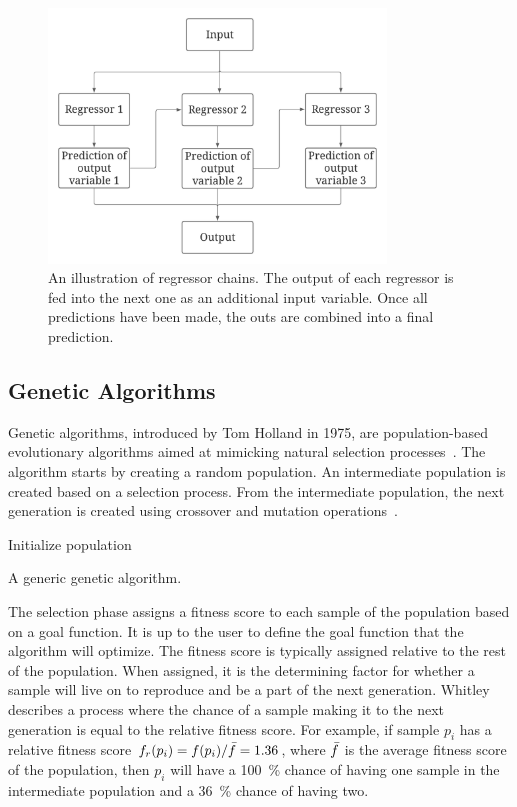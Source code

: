 \begin{figure}
    \centering
    \includegraphics[width=0.8\textwidth]{chapters/figures/background/regressor_chain_illustration.pdf}
    \caption{An illustration of regressor chains. The output of each regressor is fed into the next one as an additional input variable.
    Once all predictions have been made, the outs are combined into a final prediction.}
    \label{fig:regressor_chain_illustration}
\end{figure}

\subsection{Genetic Algorithms}
\label{sec:genetic_algorithms}
Genetic algorithms, introduced by Tom Holland in 1975, are population-based evolutionary algorithms aimed at mimicking natural selection processes~\cite{holland1992adaptation}.
The algorithm starts by creating a random population.
An intermediate population is created based on a selection process.
From the intermediate population, the next generation is created using crossover and mutation operations~\cite{whitley1994genetic}.

\begin{algorithm}[H]
\SetAlgoLined
{}
 Initialize population\;
 \caption{A generic genetic algorithm.}
\end{algorithm}

The selection phase assigns a fitness score to each sample of the population based on a goal function.
It is up to the user to define the goal function that the algorithm will optimize.
The fitness score is typically assigned relative to the rest of the population.
When assigned, it is the determining factor for whether a sample will live on to reproduce and be a part of the next generation.
Whitley\cite{whitley1994genetic} describes a process where the chance of a sample making it to the next generation is equal to the relative fitness score.
For example, if sample $p_i$ has a relative fitness score $f_r( p_i ) = f(p_i) / \Bar{f} = 1.36 $, where $\Bar{f}$ is the average fitness score of the population, then $p_i$ will have a \SI{100}{\percent} chance of having one sample in the intermediate population and a \SI{36}{\percent} chance of having two.

